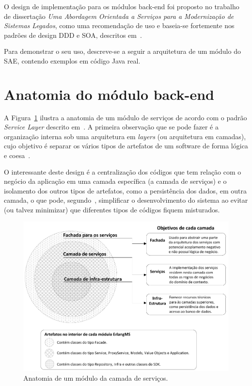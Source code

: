 O design de implementação para os módulos back-end foi
proposto no trabalho de dissertação \textit{Uma Abordagem Orientada a Serviços para a Modernização de Sistemas Legados}, 
como uma recomendação de uso e baseia-se fortemente 
nos padrões de design \acrshort{DDD} e \acrshort{SOA},
descritos em~\cite{avram2007domain, evans2004domain, fowler2002patterns, krafzig2004service, SOA_patterns_2012}.

Para demonstrar o seu uso,
descreve-se a seguir 
a arquitetura de um módulo do \acrshort{SAE},
contendo
exemplos em código Java real.

\section{Anatomia do módulo back-end}

A Figura~\ref{fig:arquitetura_modulo} ilustra
a anatomia de um módulo de serviços
de acordo com o padrão \textit{Service Layer}
descrito em~\cite{fowler2002patterns}.
A primeira observação que
se pode fazer é a 
organização interna sob uma arquitetura
em \textit{layers} (ou arquitetura em camadas),
cujo objetivo é separar os 
vários tipos de artefatos 
de um software de forma lógica e coesa~\cite{evans2004domain}.

O interessante deste design 
é a centralização dos códigos
que tem relação com o negócio da aplicação
em uma camada específica (a camada de serviços)
e o isolamento dos outros tipos
de artefatos, como a persistência dos dados, em outra camada,
o que pode, segundo~\cite{avram2007domain}, simplificar o desenvolvimento do sistema 
ao evitar (ou talvez minimizar) que diferentes tipos 
de códigos fiquem misturados.



\begin{figure}[htb]
\centering
\includegraphics[scale=0.9]{img/processo/arquitetura_modulo.pdf}
\caption{Anatomia de um módulo da camada de serviços.}
\label{fig:arquitetura_modulo}
\end{figure}



